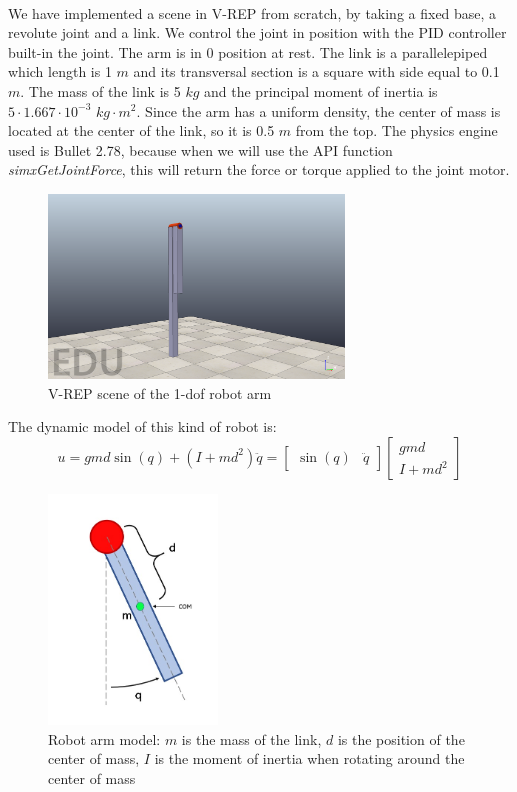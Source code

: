 \documentclass{article}
\begin{document}
\paragraph{} We have implemented a scene in V-REP from scratch, by taking a fixed base, a revolute joint and a link. We control the joint in position with the PID controller built-in the joint. The arm is in 0 position at rest. The link is a parallelepiped which length is 1 $m$ and its transversal section is a square with side equal to 0.1 $m$. The mass of the link is 5 $kg$ and the principal moment of inertia is $5\cdot1.667\cdot10^{-3}$ $kg\cdot m^2$. Since the arm has a uniform density, the center of mass is located at the center of the link, so it is 0.5 $m$ from the top. The physics engine used is Bullet 2.78, because when we will use the API function \textit{simxGetJointForce}, this will return the force or torque applied to the joint motor.
\begin{figure}[!htbp]
\centering
\includegraphics[width=0.7\textwidth]{images/1-dof/scene.png}
\caption{V-REP scene of the 1-dof robot arm}
\end{figure}
\FloatBarrier
The dynamic model of this kind of robot is:
\[u=gmd \sin(q) + (I+md^2)\ddot{q}= \begin{bmatrix}
\sin(q) & \ddot{q}
\end{bmatrix}\begin{bmatrix}
gmd \\ I +md^2
\end{bmatrix}\]
\begin{figure}[!htbp]
\centering
\includegraphics[width=0.4\textwidth]{images/1-dof/model.jpeg}
\caption{Robot arm model: $m$ is the mass of the link, $d$ is the position of the center of mass, $I$ is the moment of inertia when rotating around the center of mass}
\end{figure}
\end{document}
